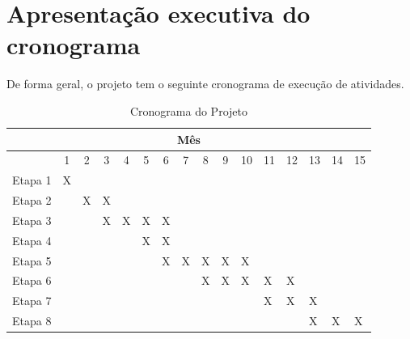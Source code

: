 \section{Apresentação executiva do cronograma}\label{sec:cronograma-projeto}

De forma geral, o projeto tem o seguinte cronograma de execução de atividades.


\begin{table}[h]
    \centering


    \begin{tabular}{|c|c|c|c|c|c|c|c|c|c|l|l|l|l|l|l|} \hline 
 \multicolumn{16}{|c|}{Mês}\\ \hline 
         &  1&  2&  3&  4&  5&  6&  7&  8&  9&10 &11 &12 & 13& 14&15\\ \hline 
         Etapa 1&  X&  &  &  &  &  &  &  &  & & & & & &\\ \hline 
         Etapa 2&  &  X&  X&  &  &  &  &  &  & & & & & &\\ \hline 
         Etapa 3&  &  &  X&  X&  X&  X&  &  &  & & & & & &\\ \hline 
         Etapa 4&  &  &  &  &  X&  X&  &  &  & & & & & &\\ \hline 
         Etapa 5&  &  &  &  &  &  X&  X&  X&  X& X& & & & &\\ \hline 
         Etapa 6&  &  &  &  &  &  &  &  X&  X& X& X&X & & &\\ \hline 
         Etapa 7&  &  &  &  &  &  &  &  &  & & X& X& X& &\\ \hline 
         Etapa 8&  &  &  &  &  &  &  &  &  & & & & X& X&X\\ \hline
    \end{tabular}
\caption{Cronograma do Projeto}
\label{tab:cronograma-projeto}
\end{table}
